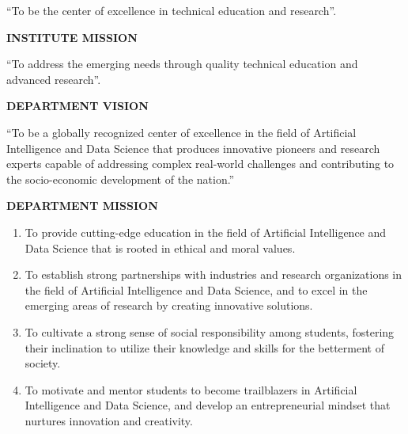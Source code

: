 \documentclass[a4paper,12pt,oneside]{book}
\begin{document}
\vspace{0.05cm}
\noindent
\fontsize{10pt}{24pt}\selectfont ``To be the center of excellence in technical education and research''.

\begin{center}
\fontsize{16pt}{16pt}\textbf{INSTITUTE MISSION}
\end{center}

\vspace{0.05cm}
\noindent
\fontsize{10pt}{24pt}\selectfont ``To address the emerging needs through quality technical education and advanced research''.

\vspace{0.05cm}

\begin{center}
\fontsize{16pt}{16pt}\textbf{DEPARTMENT VISION}
\end{center}

\vspace{0.05cm}
\noindent
\fontsize{10pt}{24pt}\selectfont ``To be a globally recognized center of excellence in the field of Artificial Intelligence and Data Science that produces innovative pioneers and research experts capable of addressing complex real-world challenges and contributing to the socio-economic development of the nation.''

\begin{center}
\fontsize{16pt}{16pt}\textbf{DEPARTMENT MISSION}
\end{center}

\vspace{0.05cm}
\noindent
\fontsize{10pt}{24pt}\selectfont
\begin{enumerate}
    \item To provide cutting-edge education in the field of Artificial Intelligence and Data Science that is rooted in ethical and moral values.
    \item To establish strong partnerships with industries and research organizations in the field of Artificial Intelligence and Data Science, and to excel in the emerging areas of research by creating innovative solutions.
    \item To cultivate a strong sense of social responsibility among students, fostering their inclination to utilize their knowledge and skills for the betterment of society.
    \item To motivate and mentor students to become trailblazers in Artificial Intelligence and Data Science, and develop an entrepreneurial mindset that nurtures innovation and creativity.
\end{enumerate}
\end{document}
